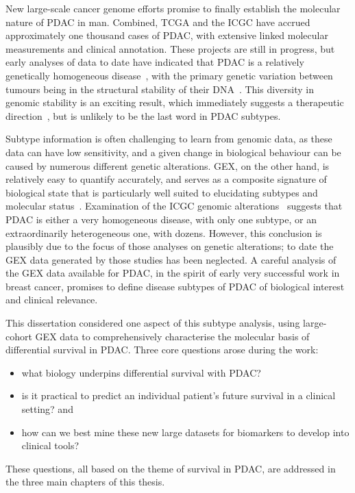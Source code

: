 \documentclass[thesis.tex]{subfiles}
\begin{document}
New large-scale cancer genome efforts promise to finally establish the molecular nature of \gls{PDAC} in man.  Combined, \gls{TCGA} and the \gls{ICGC} have accrued approximately one thousand cases of \gls{PDAC}, with extensive linked molecular measurements and clinical annotation.  These projects are still in progress, but early analyses of data to date have indicated that \gls{PDAC} is a relatively genetically homogeneous disease~\cite{Biankin2012}, with the primary genetic variation between tumours being in the structural stability of their DNA~\cite{Waddell2015}.  This diversity in genomic stability is an exciting result, which immediately suggests a therapeutic direction~\cite{Waddell2015}, but is unlikely to be the last word in \gls{PDAC} subtypes.

Subtype information is often challenging to learn from genomic data, as these data can have low sensitivity, and a given change in biological behaviour can be caused by numerous different genetic alterations.  \Gls{GEX}, on the other hand, is relatively easy to quantify accurately, and serves as a composite signature of biological state that is particularly well suited to elucidating subtypes and molecular status~\cite{Ray2014}.  Examination of the \gls{ICGC} genomic alterations~\cite{Biankin2012, Waddell2015} suggests that \gls{PDAC} is either a very homogeneous disease, with only one subtype, or an extraordinarily heterogeneous one, with dozens.  However, this conclusion is plausibly due to the focus of those analyses on genetic alterations; to date the \gls{GEX} data generated by those studies has been neglected.  A careful analysis of the \gls{GEX} data available for \gls{PDAC}, in the spirit of early very successful work in breast cancer, promises to define disease subtypes of \gls{PDAC} of biological interest and clinical relevance.

This dissertation considered one aspect of this subtype analysis, using large-cohort \gls{GEX} data to comprehensively characterise the molecular basis of differential survival in \gls{PDAC}.  Three core questions arose during the work: 
\begin{itemize}
\item what biology underpins differential survival with \gls{PDAC}?
\item is it practical to predict an individual patient's future survival in a clinical setting? and
\item how can we best mine these new large datasets for biomarkers to develop into clinical tools?
\end{itemize}
These questions, all based on the theme of survival in \gls{PDAC}, are addressed in the three main chapters of this thesis.
\end{document}
